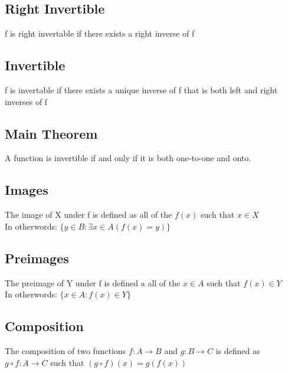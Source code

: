 \documentclass{article}
\begin{document}
\subsection*{Right Invertible}
f is right invertable if there exists a right inverse of f

\subsection*{Invertible}
f is invertable if there exists a unique inverse of f that is both left and right inverses of f

\subsection*{Main Theorem}
A function is invertible if and only if it is both one-to-one and onto.

\subsection*{Images}
The image of X under f is defined as all of the $f(x)$ such that $x \in X$ \\
In otherwords: $\{y \in B: \exists x \in A (f(x) = y) \}$
\subsection*{Preimages}
The preimage of Y under f is defined a all of the $x \in A$ such that $f(x) \in Y$ \\ 
In otherwords: $\{x \in A: f(x) \in Y\}$

\subsection*{Composition}
The composition of two functions $f: A \rightarrow B$ and $g: B \rightarrow C$ is defined as $g \circ f: A \rightarrow C$ such that $(g \circ f)(x) = g(f(x))$
\end{document}
